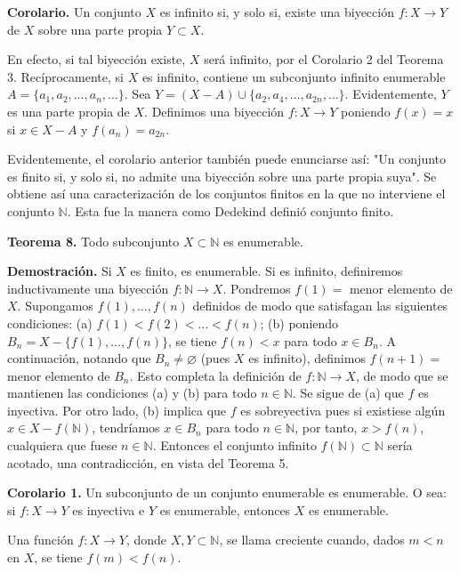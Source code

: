 \textbf{Corolario.} Un conjunto \( X \) es infinito si, y solo si, existe una biyección \( f: X \to Y \) de \( X \) sobre una parte propia \( Y \subset X \).

En efecto, si tal biyección existe, \( X \) será infinito, por el Corolario 2 del Teorema 3. Recíprocamente, si \( X \) es infinito, contiene un subconjunto infinito enumerable \( A = \{a_1, a_2, \dots, a_n, \dots\} \). Sea \( Y = (X - A) \cup \{a_2, a_4, \dots, a_{2n}, \dots\} \). Evidentemente, \( Y \) es una parte propia de \( X \). Definimos una biyección \( f: X \to Y \) poniendo \( f(x) = x \) si \( x \in X - A \) y \( f(a_n) = a_{2n} \).

Evidentemente, el corolario anterior también puede enunciarse así: "Un conjunto es finito si, y solo si, no admite una biyección sobre una parte propia suya". Se obtiene así una caracterización de los conjuntos finitos en la que no interviene el conjunto \( \mathbb{N} \). Esta fue la manera como Dedekind definió conjunto finito.

\textbf{Teorema 8.} Todo subconjunto \( X \subset \mathbb{N} \) es enumerable.

\textbf{Demostración.} Si \( X \) es finito, es enumerable. Si es infinito, definiremos inductivamente una biyección \( f: \mathbb{N} \to X \). Pondremos \( f(1) = \) menor elemento de \( X \). Supongamos \( f(1), \dots, f(n) \) definidos de modo que satisfagan las siguientes condiciones: (a) \( f(1) < f(2) < \dots < f(n) \); (b) poniendo \( B_n = X - \{f(1), \dots, f(n)\} \), se tiene \( f(n) < x \) para todo \( x \in B_n \). A continuación, notando que \( B_n \neq \varnothing \) (pues \( X \) es infinito), definimos \( f(n+1) = \) menor elemento de \( B_n \). Esto completa la definición de \( f: \mathbb{N} \to X \), de modo que se mantienen las condiciones (a) y (b) para todo \( n \in \mathbb{N} \). Se sigue de (a) que \( f \) es inyectiva. Por otro lado, (b) implica que \( f \) es sobreyectiva pues si existiese algún \( x \in X - f(\mathbb{N}) \), tendríamos \( x \in B_n \) para todo \( n \in \mathbb{N} \), por tanto, \( x > f(n) \), cualquiera que fuese \( n \in \mathbb{N} \). Entonces el conjunto infinito \( f(\mathbb{N}) \subset \mathbb{N} \) sería acotado, una contradicción, en vista del Teorema 5.

\textbf{Corolario 1.} Un subconjunto de un conjunto enumerable es enumerable. O sea: si \( f: X \to Y \) es inyectiva e \( Y \) es enumerable, entonces \( X \) es enumerable.

Una función \( f: X \to Y \), donde \( X, Y \subset \mathbb{N} \), se llama creciente cuando, dados \( m < n \) en \( X \), se tiene \( f(m) < f(n) \).

